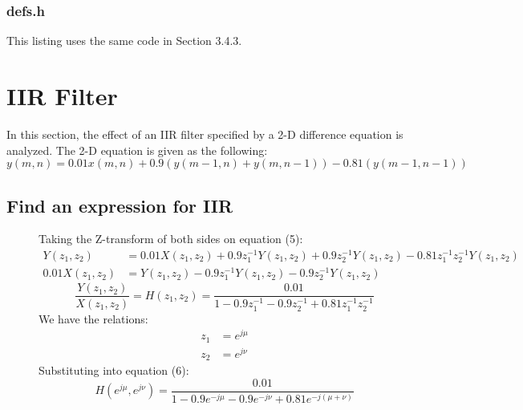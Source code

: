 \documentclass{article}
\begin{document}
\subsubsection{defs.h}
This listing uses the same code in Section 3.4.3.


\section{IIR Filter}

In this section, the effect of an IIR filter specified by a 2-D difference equation is analyzed. The 2-D equation is given as the following:
\begin{equation}
y(m,n)=0.01x(m,n)+0.9(y(m-1,n)+y(m,n-1))-0.81(y(m-1,n-1))
\end{equation}

\subsection{Find an expression for IIR}
\begin{description}
\item[]
Taking the Z-transform of both sides on equation (5):
\begin{align*}
Y(z_1,z_2) &= 0.01X(z_1,z_2)+0.9z_1^{-1}Y(z_1,z_2)+0.9z_2^{-1}Y(z_1,z_2)-0.81z_1^{-1}z_2^{-1}Y(z_1,z_2) \\
0.01X(z_1,z_2) &= Y(z_1,z_2)-0.9z_1^{-1}Y(z_1,z_2)-0.9z_2^{-1}Y(z_1,z_2)
\end{align*}
\begin{equation}
\frac{Y(z_1,z_2)}{X(z_1,z_2)} = H(z_1,z_2) = \frac{0.01}{1-0.9z_1^{-1}-0.9z_2^{-1}+0.81z_1^{-1}z_2^{-1}}
\end{equation}
We have the relations:
\begin{align*}
z_1 &= e^{j\mu} \\
z_2 &= e^{j\nu}
\end{align*}
Substituting into equation (6):
\begin{equation}
H(e^{j\mu},e^{j\nu}) = \frac{0.01}{1-0.9e^{-j\mu}-0.9e^{-j\nu}+0.81e^{-j(\mu + \nu)}}
\end{equation}
\end{description}
\end{document}
